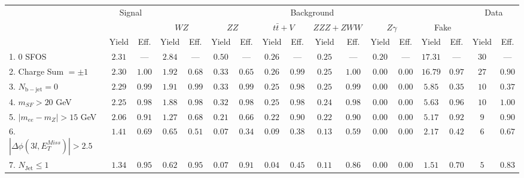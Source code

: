 \begin{tabular}{l||c|c||c|c||c|c||c|c||c|c||c|c||c|c||c|c}
\hline
 &                 \multicolumn{2}{c||}{Signal}            &  \multicolumn{12}{c||}{Background} &  \multicolumn{2}{c}{Data} \\
 & &  & \multicolumn{2}{c||}{$WZ$} & \multicolumn{2}{c||}{$ZZ$} & \multicolumn{2}{c||}{$t\bar{t}+V$} & \multicolumn{2}{c||}{$ZZZ+ZWW$} & \multicolumn{2}{c||}{$Z\gamma$} & \multicolumn{2}{c||}{Fake} &  & \\ 
 & Yield & Eff. & Yield & Eff. & Yield & Eff. & Yield & Eff. & Yield & Eff. & Yield & Eff. & Yield & Eff. & Yield & Eff.\\
\hline\hline
1. 0 SFOS &  $2.31$ &  --- &  $2.84$ &  --- &  $0.50$ &  --- &  $0.26$ &  --- &  $0.25$ &  --- &  $0.20$ &  --- &  $17.31$ &  --- & $30$ &  ---\\ 
\hline
2. Charge Sum $= \pm 1$ &  $2.30$ &  $1.00$ &  $1.92$ &  $0.68$ &  $0.33$ &  $0.65$ &  $0.26$ &  $0.99$ &  $0.25$ &  $1.00$ &  $0.00$ &  $0.00$ &  $16.79$ &  $0.97$ & $27$ &  $0.90$\\ 
\hline
3. $N_{\mathrm{b-jet}} = 0$ &  $2.29$ &  $0.99$ &  $1.91$ &  $0.99$ &  $0.33$ &  $0.99$ &  $0.25$ &  $0.98$ &  $0.25$ &  $0.99$ &  $0.00$ &  $0.00$ &  $5.85$ &  $0.35$ & $10$ &  $0.37$\\ 
\hline
4. $m_{SF} > 20$ GeV &  $2.25$ &  $0.98$ &  $1.88$ &  $0.98$ &  $0.32$ &  $0.98$ &  $0.25$ &  $0.98$ &  $0.24$ &  $0.98$ &  $0.00$ &  $0.00$ &  $5.63$ &  $0.96$ & $10$ &  $1.00$\\ 
\hline
5. $|m_{ee} - m_{Z}| > 15$ GeV &  $2.06$ &  $0.91$ &  $1.27$ &  $0.68$ &  $0.21$ &  $0.66$ &  $0.22$ &  $0.90$ &  $0.22$ &  $0.90$ &  $0.00$ &  $0.00$ &  $5.17$ &  $0.92$ & $9$ &  $0.90$\\ 
\hline
6. $|\Delta\phi(3l,E_{T}^{Miss})| > 2.5$ &  $1.41$ &  $0.69$ &  $0.65$ &  $0.51$ &  $0.07$ &  $0.34$ &  $0.09$ &  $0.38$ &  $0.13$ &  $0.59$ &  $0.00$ &  $0.00$ &  $2.17$ &  $0.42$ & $6$ &  $0.67$\\ 
\hline
7. $N_{\mathrm{Jet}} \leq 1$ &  $1.34$ &  $0.95$ &  $0.62$ &  $0.95$ &  $0.07$ &  $0.91$ &  $0.04$ &  $0.45$ &  $0.11$ &  $0.86$ &  $0.00$ &  $0.00$ &  $1.51$ &  $0.70$ & $5$ &  $0.83$\\ 
\hline
\end{tabular}



